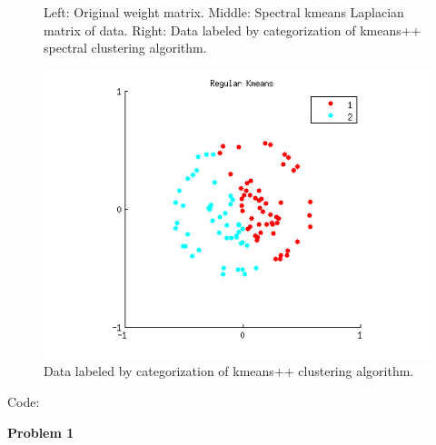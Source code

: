 \documentclass{article}
\begin{document}
\begin{homeworkProblem}
\begin{figure}[!ht]
\begin{centering}
        \caption{\label{fig:spectral} Left: Original weight matrix. Middle:
        Spectral kmeans Laplacian matrix of data. Right: Data labeled by
    categorization of kmeans++ spectral clustering algorithm.} 
    
        \end{centering}

    \end{figure} 
   
    \begin{figure}[!ht]
        
        \begin{centering}
        
        \includegraphics[width=\linewidth]{hw9_fig_regular_kmeans.png}

        \caption{\label{fig:kmeans} Data labeled by categorization of kmeans++
        clustering algorithm. } 
    
        \end{centering}

    \end{figure} 


\end{homeworkProblem}
\clearpage

\clearpage
{\huge Code:}

{\large \bf Problem 1} \\
 
\end{document}
